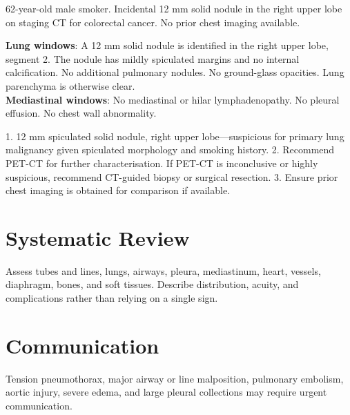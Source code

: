 \begin{testbox}[Indications:]
62-year-old male smoker. Incidental 12 mm solid nodule in the right upper lobe on staging CT for colorectal cancer. No prior chest imaging available.
\end{testbox}
\begin{refbox}[Findings:]
\textbf{Lung windows}: A 12 mm solid nodule is identified in the right upper lobe, segment 2. The nodule has mildly spiculated margins and no internal calcification. No additional pulmonary nodules. No ground-glass opacities. Lung parenchyma is otherwise clear.\\
\textbf{Mediastinal windows}: No mediastinal or hilar lymphadenopathy. No pleural effusion. No chest wall abnormality.
\end{refbox}
\begin{pearlbox}[Impression:]
1. 12 mm spiculated solid nodule, right upper lobe---suspicious for primary lung malignancy given spiculated morphology and smoking history.
2. Recommend PET-CT for further characterisation. If PET-CT is inconclusive or highly suspicious, recommend CT-guided biopsy or surgical resection.
3. Ensure prior chest imaging is obtained for comparison if available.
\end{pearlbox}


\section{Systematic Review}
Assess tubes and lines, lungs, airways, pleura, mediastinum, heart, vessels, diaphragm, bones, and soft tissues. Describe distribution, acuity, and complications rather than relying on a single sign.

\section{Communication}
Tension pneumothorax, major airway or line malposition, pulmonary embolism, aortic injury, severe edema, and large pleural collections may require urgent communication.

\clearpage
